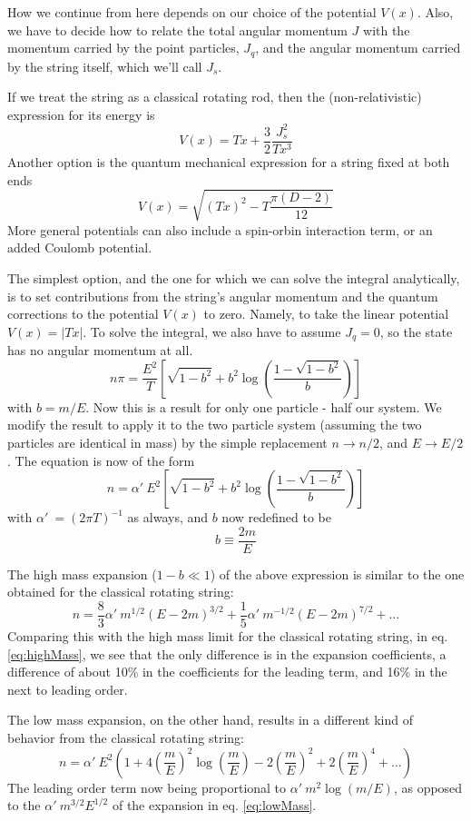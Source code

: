\documentclass[11pt,a4]{article}
\def\be{\begin{equation}}
\def\ee{\end{equation}}
\newcommand{\alp}{\ensuremath{\alpha'\:}}
\begin{document}
	How we continue from here depends on our choice of the potential \(V(x)\). Also, we have to decide how to relate the total angular momentum \(J\) with the momentum carried by the point particles, \(J_q\), and the angular momentum carried by the string itself, which we'll call \(J_s\).

	If we treat the string as a classical rotating rod, then the (non-relativistic) expression for its energy is
		\be V(x) = Tx + \frac{3}{2}\frac{J_s^2}{Tx^3} \ee	
	Another option is the quantum mechanical expression for a string fixed at both ends\cite{Arvis:1983fp}
		\be V(x) = \sqrt{(Tx)^2 - T\frac{\pi(D-2)}{12}} \ee
	More general potentials can also include a spin-orbin interaction term, or an added Coulomb potential.

	The simplest option, and the one for which we can solve the integral analytically, is to set contributions from the string's angular momentum and the quantum corrections to the potential \(V(x)\) to zero. Namely, to take the linear potential \(V(x) = |Tx|\). To solve the integral, we also have to assume \(J_q = 0\), so the state has no angular momentum at all.
		\be n\pi = \frac{E^2}{T}\left[\sqrt{1-b^2}+b^2\log\left(\frac{1-\sqrt{1-b^2}}{b}\right)\right] \ee
		with \(b = m/E\). Now this is a result for only one particle - half our system. We modify the result to apply it to the two particle system (assuming the two particles are identical in mass) by the simple replacement \(n \rightarrow n/2\), and \(E \rightarrow E/2\). The equation is now of the form
		\be n = \alp E^2 \left[\sqrt{1-b^2}+b^2\log\left(\frac{1-\sqrt{1-b^2}}{b}\right)\right] \ee
		with \(\alp = (2\pi T)^{-1}\) as always, and \(b\) now redefined to be
		\be b \equiv \frac{2m}{E} \ee

		The high mass expansion (\(1-b \ll 1\)) of the above expression is similar to the one obtained for the classical rotating string:
		\be n = \frac{8}{3}\alp m^{1/2}(E-2m)^{3/2} + \frac{1}{5}\alp m^{-1/2}(E-2m)^{7/2} + \ldots \label{eq:highMassW} \ee
		Comparing this with the high mass limit for the classical rotating string, in eq. \eqref{eq:highMass}, we see that the only difference is in the expansion coefficients, a difference of about 10\% in the coefficients for the leading term, and 16\% in the next to leading order.

		The low mass expansion, on the other hand, results in a different kind of behavior from the classical rotating string:
		\be n = \alp E^2 \left(1 + 4\left(\frac{m}{E}\right)^2\log\left(\frac{m}{E}\right)
						- 2\left(\frac{m}{E}\right)^2 + 2\left(\frac{m}{E}\right)^4+\ldots\right) \label{eq:lowMassW} \ee
		The leading order term now being proportional to \(\alp m^2 \log(m/E)\), as opposed to the \(\alp m^{3/2} E^{1/2}\) of the expansion in eq. \eqref{eq:lowMass}.
\end{document}

